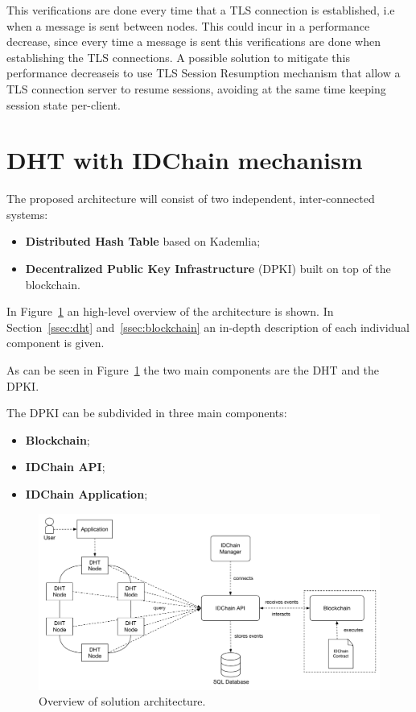 This verifications are done every time that a TLS connection is established, i.e when a message is sent between nodes.
This could incur in a performance decrease, since every time a message is sent this verifications are done when establishing the TLS connections.
A possible solution to mitigate this performance decreaseis to use TLS Session Resumption\cite{rfc5077} mechanism that allow a TLS connection server to resume sessions, avoiding at the same time keeping session state per-client.

\section{DHT with IDChain mechanism}\label{architecture:idchain-overview}

The proposed architecture will consist of two independent, inter-connected systems:

\begin{itemize}
	\item \textbf{Distributed Hash Table} based on Kademlia;
	\item \textbf{Decentralized Public Key Infrastructure} (DPKI) built on top of the blockchain.
\end{itemize}


In Figure~\ref{fig:architecture-overview} an high-level overview of the architecture is shown.
In Section~\ref{ssec:dht} and~\ref{ssec:blockchain} an in-depth description of each individual component is given.

As can be seen in Figure~\ref{fig:architecture-overview} the two main components are the \ac{DHT} and the \ac{DPKI}.

The DPKI can be subdivided in three main components:
\begin{itemize}
	\item \textbf{Blockchain};
	\item \textbf{IDChain API};
	\item \textbf{IDChain Application};
\end{itemize}

\begin{figure}[htb]
  \includegraphics[width=\linewidth]{Figures/architecture-overview.pdf}
    \caption{Overview of solution architecture.}
\label{fig:architecture-overview}
\end{figure}

